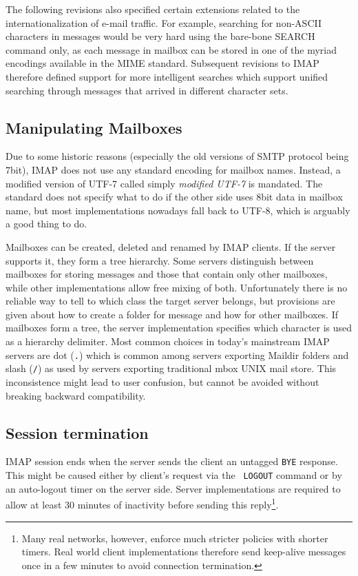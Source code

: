 \documentclass[12pt,notitlepage]{report}
\begin{document}
The following revisions also specified certain extensions related to the
internationalization of e-mail traffic.  For example, searching for non-ASCII
characters in messages would be very hard using the bare-bone SEARCH command
only, as each message in mailbox can be stored in one of the myriad encodings
available in the MIME standard.  Subsequent revisions to IMAP therefore defined
support for more intelligent searches which support unified searching through
messages that arrived in different character sets.

\subsection{Manipulating Mailboxes}

Due to some historic reasons (especially the old versions of SMTP protocol being
7bit), IMAP does not use any standard encoding for mailbox names.  Instead, a
modified version of UTF-7 called simply {\em modified UTF-7} is mandated.  The
standard does not specify what to do if the other side uses 8bit data in mailbox
name, but most implementations nowadays fall back to UTF-8, which is arguably a
good thing to do.

Mailboxes can be created, deleted and renamed by IMAP clients.  If the server
supports it, they form a tree hierarchy.  Some servers distinguish between
mailboxes for storing messages and those that contain only other mailboxes,
while other implementations allow free mixing of both.  Unfortunately there is
no reliable way to tell to which class the target server belongs, but provisions
are given about how to create a folder for message and how for other mailboxes.
If mailboxes form a tree, the server implementation specifies which character is
used as a hierarchy delimiter.  Most common choices in today's mainstream IMAP
servers are dot ({\tt .}) which is common among servers exporting Maildir
folders and slash ({\tt /}) as used by servers exporting traditional mbox UNIX
mail store.  This inconsistence might lead to user confusion, but cannot be
avoided without breaking backward compatibility.

\subsection{Session termination}

IMAP session ends when the server sends the client an untagged {\tt BYE}
response.  This might be caused either by client's request via the {\tt
LOGOUT} command or by an auto-logout timer on the server side.  Server
implementations are required to allow at least 30 minutes of inactivity before
sending this reply\footnote{Many real networks, however, enforce much stricter
policies with shorter timers.  Real world client implementations therefore send
keep-alive messages once in a few minutes to avoid connection termination.}.
\end{document}
